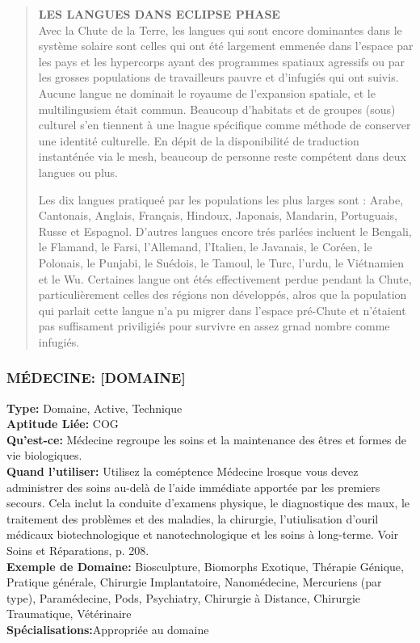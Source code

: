 \begin{quotation} \textbf{LES LANGUES DANS ECLIPSE PHASE} \\ Avec la Chute de la Terre, les langues qui sont encore dominantes dans le système solaire sont celles qui ont été largement emmenée dans l'espace par les pays et les hypercorps ayant des programmes spatiaux agressifs ou par les grosses populations de travailleurs pauvre et d'infugiés qui ont suivis. Aucune langue ne dominait le royaume de l'expansion spatiale, et le multilingusiem était commun. Beaucoup d'habitats et de groupes (sous) culturel s'en tiennent à une lnague spécifique comme méthode de conserver une identité culturelle. En dépit de la disponibilité de traduction instanténée via le mesh, beaucoup de personne reste compétent dans deux langues ou plus.
   
   Les dix langues pratiqueé par les populations les plus larges sont : Arabe, Cantonais, Anglais, Français, Hindoux, Japonais, Mandarin, Portuguais, Russe et Espagnol. D'autres langues encore trés parlées incluent le Bengali, le Flamand, le Farsi, l'Allemand, l'Italien, le Javanais, le Coréen, le Polonais, le Punjabi, le Suédois, le Tamoul, le Turc, l'urdu, le Viétnamien et le Wu.  Certaines langue ont étés effectivement perdue pendant la Chute, particulièrement celles des régions non développés, alros que la population qui parlait cette langue n'a pu migrer dans l'espace pré-Chute et n'étaient pas suffisament priviligiés pour survivre en assez grnad nombre comme infugiés. \end{quotation} 





\subsubsection{MÉDECINE: [DOMAINE]} \textbf{Type:} Domaine, Active, Technique \\ \textbf{Aptitude Liée:} COG \\ \textbf{Qu'est-ce:} Médecine regroupe les soins et la maintenance des êtres et formes de vie biologiques. \\ \textbf{Quand l'utiliser:} Utilisez la coméptence Médecine lrosque vous devez administrer des soins au-delà de l'aide immédiate apportée par les premiers secours. Cela inclut la conduite d'examens physique, le diagnostique des maux, le traitement des problèmes et des maladies, la chirurgie, l'utiulisation d'ouril médicaux biotechnologique et nanotechnologique et les soins à long-terme. Voir Soins et Réparations, p. 208. \\ \textbf{Exemple de Domaine:} Biosculpture, Biomorphs Exotique, Thérapie Génique, Pratique générale, Chirurgie Implantatoire, Nanomédecine, Mercuriens (par type), Paramédecine, Pods, Psychiatry, Chirurgie à Distance, Chirurgie Traumatique, Vétérinaire \\ \textbf{Spécialisations:}Appropriée au domaine 

